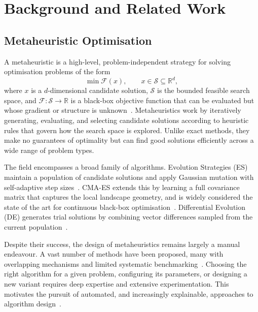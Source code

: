 
\chapter{Background and Related Work}
\label{ch:background}

\section{Metaheuristic Optimisation}
\label{sec:bg-metaheuristics}

A metaheuristic is a high-level, problem-independent strategy for solving optimisation problems of the form
\[
  \min \mathcal{F}(x), \qquad x \in \mathcal{S} \subseteq \mathbb{R}^d,
\]
where $x$ is a $d$-dimensional candidate solution, $\mathcal{S}$ is the bounded feasible search space, and $\mathcal{F}: \mathcal{S} \to \mathbb{R}$ is a black-box objective function that can be evaluated but whose gradient or structure is unknown~\cite{sorensen2013metaheuristics}. Metaheuristics work by iteratively generating, evaluating, and selecting candidate solutions according to heuristic rules that govern how the search space is explored. Unlike exact methods, they make no guarantees of optimality but can find good solutions efficiently across a wide range of problem types.

The field encompasses a broad family of algorithms. Evolution Strategies (ES) maintain a population of candidate solutions and apply Gaussian mutation with self-adaptive step sizes~\cite{back1996evolutionary}. CMA-ES extends this by learning a full covariance matrix that captures the local landscape geometry, and is widely considered the state of the art for continuous black-box optimisation~\cite{hansen2001cmaes}. Differential Evolution (DE) generates trial solutions by combining vector differences sampled from the current population~\cite{storn1997de}.

Despite their success, the design of metaheuristics remains largely a manual endeavour. A vast number of methods have been proposed, many with overlapping mechanisms and limited systematic benchmarking~\cite{aranha2022metaphor}. Choosing the right algorithm for a given problem, configuring its parameters, or designing a new variant requires deep expertise and extensive experimentation. This motivates the pursuit of automated, and increasingly explainable, approaches to algorithm design~\cite{vanStein2025Explainable}.


